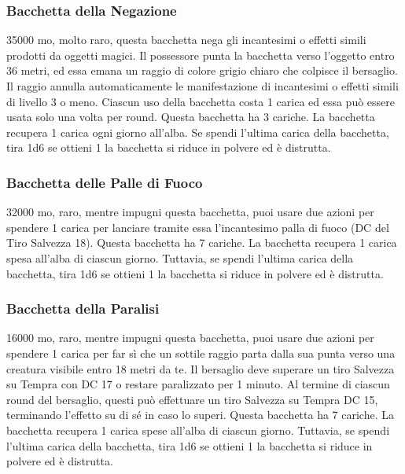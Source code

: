 \begin{multicols}{2}

\subsubsection*{Bacchetta della Negazione}
35000 mo, molto raro, questa bacchetta nega gli incantesimi o effetti simili prodotti da oggetti magici. Il possessore punta la bacchetta verso l'oggetto entro 36 metri, ed essa emana un raggio di colore grigio chiaro che colpisce il bersaglio. Il raggio annulla automaticamente le manifestazione di incantesimi o effetti simili di livello 3 o meno. Ciascun uso della bacchetta costa 1 carica ed essa può essere usata solo una volta per round. Questa bacchetta ha 3 cariche. La bacchetta recupera 1 carica ogni giorno all'alba. Se spendi l'ultima carica della bacchetta, tira 1d6 se ottieni 1 la bacchetta si riduce in polvere ed è distrutta.

\subsubsection*{Bacchetta delle Palle di Fuoco}
32000 mo, raro, mentre impugni questa bacchetta, puoi usare due azioni per spendere 1 carica per lanciare tramite essa l'incantesimo palla di fuoco (DC del Tiro Salvezza 18). Questa bacchetta ha 7 cariche. La bacchetta recupera 1 carica spesa all'alba di ciascun giorno. Tuttavia, se spendi l'ultima carica della bacchetta, tira 1d6 se ottieni 1 la bacchetta si riduce in polvere ed è distrutta.

\subsubsection*{Bacchetta della Paralisi}
16000 mo, raro, mentre impugni questa bacchetta, puoi usare due azioni per spendere 1 carica per far sì che un sottile raggio parta dalla sua punta verso una creatura visibile entro 18 metri da te. Il bersaglio deve superare un tiro Salvezza su Tempra con DC 17 o restare paralizzato per 1 minuto. Al termine di ciascun round del bersaglio, questi può effettuare un tiro Salvezza su Tempra DC 15, terminando l'effetto su di sé in caso lo superi. Questa bacchetta ha 7 cariche. La bacchetta recupera 1 carica spese all'alba di ciascun giorno. Tuttavia, se spendi l'ultima carica della bacchetta, tira 1d6 se ottieni 1 la bacchetta si riduce in polvere ed è distrutta.


\end{multicols}
